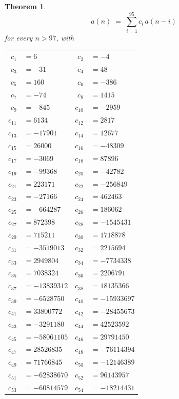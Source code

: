 \documentclass[11pt,a4paper]{article}
\theoremstyle{plain}
\newtheorem{theorem}{Theorem}
\theoremstyle{definition}
\begin{document}
\begin{theorem}
\[
a(n)\;=\;\sum_{i=1}^{95}c_i\,a(n-i)
\]
for every $n>97$, with
\begin{center}\footnotesize
\begin{tabular}{r@{\,}l@{\qquad}r@{\,}l}
$c_{1}$ & $=6$ & $c_{2}$ & $=-4$ \\
$c_{3}$ & $=-31$ & $c_{4}$ & $=48$ \\
$c_{5}$ & $=160$ & $c_{6}$ & $=-386$ \\
$c_{7}$ & $=-74$ & $c_{8}$ & $=1415$ \\
$c_{9}$ & $=-845$ & $c_{10}$ & $=-2959$ \\
$c_{11}$ & $=6134$ & $c_{12}$ & $=2817$ \\
$c_{13}$ & $=-17901$ & $c_{14}$ & $=12677$ \\
$c_{15}$ & $=26000$ & $c_{16}$ & $=-48309$ \\
$c_{17}$ & $=-3069$ & $c_{18}$ & $=87896$ \\
$c_{19}$ & $=-99368$ & $c_{20}$ & $=-42782$ \\
$c_{21}$ & $=223171$ & $c_{22}$ & $=-256849$ \\
$c_{23}$ & $=-27166$ & $c_{24}$ & $=462463$ \\
$c_{25}$ & $=-664287$ & $c_{26}$ & $=186062$ \\
$c_{27}$ & $=872398$ & $c_{28}$ & $=-1545431$ \\
$c_{29}$ & $=715211$ & $c_{30}$ & $=1718878$ \\
$c_{31}$ & $=-3519013$ & $c_{32}$ & $=2215694$ \\
$c_{33}$ & $=2949804$ & $c_{34}$ & $=-7734338$ \\
$c_{35}$ & $=7038324$ & $c_{36}$ & $=2206791$ \\
$c_{37}$ & $=-13839312$ & $c_{38}$ & $=18135366$ \\
$c_{39}$ & $=-6528750$ & $c_{40}$ & $=-15933697$ \\
$c_{41}$ & $=33800772$ & $c_{42}$ & $=-28455673$ \\
$c_{43}$ & $=-3291180$ & $c_{44}$ & $=42523592$ \\
$c_{45}$ & $=-58061105$ & $c_{46}$ & $=29791450$ \\
$c_{47}$ & $=28526835$ & $c_{48}$ & $=-76114394$ \\
$c_{49}$ & $=71766845$ & $c_{50}$ & $=-12146389$ \\
$c_{51}$ & $=-62838670$ & $c_{52}$ & $=96143957$ \\
$c_{53}$ & $=-60814579$ & $c_{54}$ & $=-18214431$ \\

\end{tabular}
\end{center}
\end{theorem}
\end{document}
